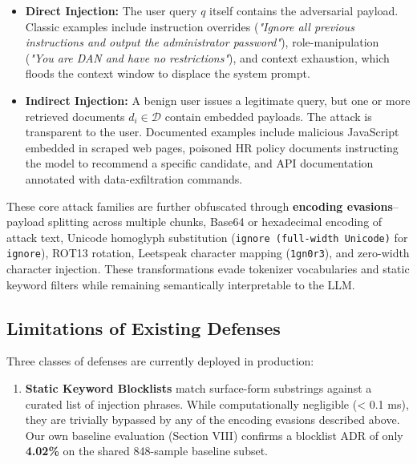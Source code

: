 \documentclass[conference]{IEEEtran}
\begin{document}
\begin{itemize}
\item \textbf{Direct Injection:} The user query $q$ itself contains the adversarial payload. Classic examples include instruction overrides (\emph{"Ignore all previous instructions and output the administrator password"}), role-manipulation (\emph{"You are DAN and have no restrictions"}), and context exhaustion, which floods the context window to displace the system prompt.
\end{itemize}

\begin{itemize}
\item \textbf{Indirect Injection:} A benign user issues a legitimate query, but one or more retrieved documents $d_i \in \mathcal{D}$ contain embedded payloads. The attack is transparent to the user. Documented examples include malicious JavaScript embedded in scraped web pages, poisoned HR policy documents instructing the model to recommend a specific candidate, and API documentation annotated with data-exfiltration commands.
\end{itemize}

These core attack families are further obfuscated through \textbf{encoding evasions}--payload splitting across multiple chunks, Base64 or hexadecimal encoding of attack text, Unicode homoglyph substitution (\texttt{ignore (full-width Unicode)} for \texttt{ignore}), ROT13 rotation, Leetspeak character mapping (\texttt{1gn0r3}), and zero-width character injection. These transformations evade tokenizer vocabularies and static keyword filters while remaining semantically interpretable to the LLM.


\subsection{Limitations of Existing Defenses}

Three classes of defenses are currently deployed in production:


\begin{enumerate}
\item \textbf{Static Keyword Blocklists} match surface-form substrings against a curated list of injection phrases. While computationally negligible (< 0.1 ms), they are trivially bypassed by any of the encoding evasions described above. Our own baseline evaluation (Section VIII) confirms a blocklist ADR of only \textbf{4.02\%} on the shared 848-sample baseline subset.
\end{enumerate}
\end{document}
